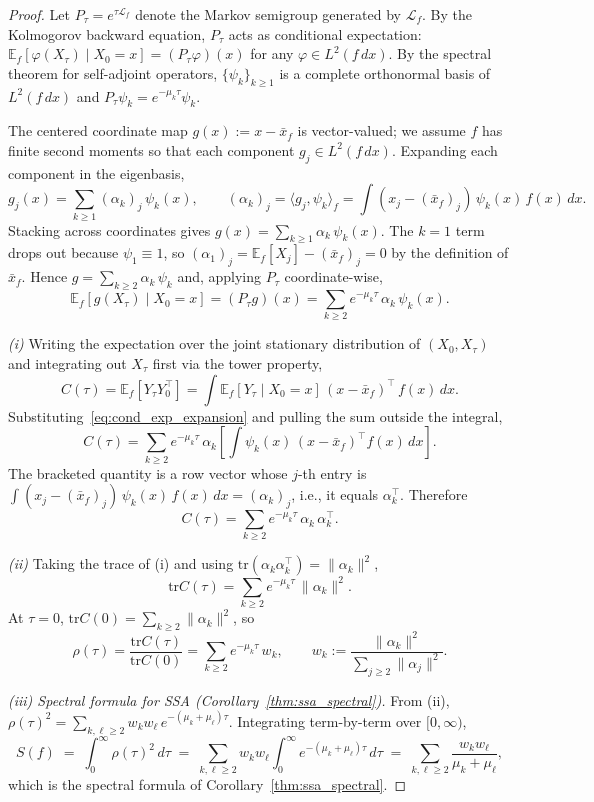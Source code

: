 \documentclass{article}
\newcommand{\E}{\mathbb{E}}
\newcommand{\tr}{\mathrm{tr}}
\newcommand{\be}{\begin{equation}}
\newcommand{\ee}{\end{equation}}
\begin{document}
\begin{proof}

Let $P_\tau = e^{\tau\mathcal{L}_f}$ denote the Markov semigroup generated by $\mathcal{L}_f$. By the Kolmogorov backward equation, $P_\tau$ acts as conditional expectation: $\E_f[\varphi(X_\tau) \mid X_0 = x] = (P_\tau \varphi)(x)$ for any $\varphi \in L^2(f\,dx)$. By the spectral theorem for self-adjoint operators, $\{\psi_k\}_{k \geq 1}$ is a complete orthonormal basis of $L^2(f\,dx)$ and $P_\tau \psi_k = e^{-\mu_k \tau}\psi_k$.

The centered coordinate map $g(x) := x - \bar x_f$ is vector-valued; we assume $f$ has finite second moments so that each component $g_j \in L^2(f\,dx)$. Expanding each component in the eigenbasis,
\[
g_j(x) = \sum_{k \geq 1} (\alpha_k)_j\, \psi_k(x), \qquad (\alpha_k)_j = \langle g_j, \psi_k\rangle_f = \int (x_j - (\bar x_f)_j)\,\psi_k(x)\,f(x)\,dx.
\]
Stacking across coordinates gives $g(x) = \sum_{k \geq 1} \alpha_k\,\psi_k(x)$. The $k = 1$ term drops out because $\psi_1 \equiv 1$, so $(\alpha_1)_j = \E_f[X_j] - (\bar x_f)_j = 0$ by the definition of $\bar x_f$. Hence $g = \sum_{k \geq 2}\alpha_k\,\psi_k$ and, applying $P_\tau$ coordinate-wise,
\be
\E_f[g(X_\tau) \mid X_0 = x] = (P_\tau g)(x) = \sum_{k \geq 2} e^{-\mu_k \tau}\,\alpha_k\,\psi_k(x).
\label{eq:cond_exp_expansion}
\ee

\textit{(i)} Writing the expectation over the joint stationary distribution of $(X_0, X_\tau)$ and integrating out $X_\tau$ first via the tower property,
\[
C(\tau) = \E_f[Y_\tau Y_0^\top] = \int \E_f[Y_\tau \mid X_0 = x]\,(x - \bar x_f)^\top\, f(x)\,dx.
\]
Substituting~\eqref{eq:cond_exp_expansion} and pulling the sum outside the integral,
\[
C(\tau) = \sum_{k \geq 2} e^{-\mu_k \tau}\,\alpha_k \left[\int \psi_k(x)\,(x - \bar x_f)^\top f(x)\,dx\right].
\]
The bracketed quantity is a row vector whose $j$-th entry is $\int (x_j - (\bar x_f)_j)\,\psi_k(x)\,f(x)\,dx = (\alpha_k)_j$, i.e., it equals $\alpha_k^\top$. Therefore
\[
C(\tau) = \sum_{k \geq 2} e^{-\mu_k \tau}\,\alpha_k\,\alpha_k^\top.
\]

\textit{(ii)} Taking the trace of (i) and using $\tr(\alpha_k \alpha_k^\top) = \|\alpha_k\|^2$,
\[
\tr C(\tau) = \sum_{k \geq 2} e^{-\mu_k \tau}\,\|\alpha_k\|^2.
\]
At $\tau = 0$, $\tr C(0) = \sum_{k \geq 2}\|\alpha_k\|^2$, so
\[
\rho(\tau) = \frac{\tr C(\tau)}{\tr C(0)} = \sum_{k \geq 2} e^{-\mu_k \tau}\,w_k, \qquad w_k := \frac{\|\alpha_k\|^2}{\sum_{j \geq 2}\|\alpha_j\|^2}.
\]

\textit{(iii) Spectral formula for SSA (Corollary~\ref{thm:ssa_spectral}).}
From (ii), $\rho(\tau)^2 = \sum_{k, \ell \geq 2} w_k w_\ell\, e^{-(\mu_k + \mu_\ell)\tau}$.
Integrating term-by-term over $[0, \infty)$,
\begin{equation}
S(f) \;=\; \int_0^\infty \rho(\tau)^2\,d\tau
\;=\; \sum_{k,\ell \geq 2} w_k w_\ell \int_0^\infty e^{-(\mu_k+\mu_\ell)\tau}\,d\tau
\;=\; \sum_{k,\ell \geq 2} \frac{w_k w_\ell}{\mu_k + \mu_\ell},
\label{eq:ST_spectral}
\end{equation}
which is the spectral formula of Corollary~\ref{thm:ssa_spectral}.
\end{proof}
\end{document}
